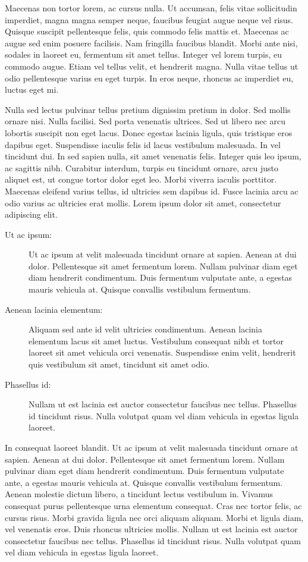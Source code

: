 Maecenas non tortor lorem, ac cursus nulla. Ut accumsan, felis vitae sollicitudin imperdiet, magna magna semper neque, faucibus feugiat augue neque vel risus. Quisque suscipit pellentesque felis, quis commodo felis mattis et. Maecenas ac augue sed enim posuere facilisis. Nam fringilla faucibus blandit. Morbi ante nisi, sodales in laoreet eu, fermentum sit amet tellus. Integer vel lorem turpis, eu commodo augue. Etiam vel tellus velit, et hendrerit magna. Nulla vitae tellus ut odio pellentesque varius eu eget turpis. In eros neque, rhoncus ac imperdiet eu, luctus eget mi.

Nulla sed lectus pulvinar tellus pretium dignissim pretium in dolor. Sed mollis ornare nisi. Nulla facilisi. Sed porta venenatis ultrices. Sed ut libero nec arcu lobortis suscipit non eget lacus. Donec egestas lacinia ligula, quis tristique eros dapibus eget. Suspendisse iaculis felis id lacus vestibulum malesuada. In vel tincidunt dui. In sed sapien nulla, sit amet venenatis felis. Integer quis leo ipsum, ac sagittis nibh. Curabitur interdum, turpis eu tincidunt ornare, arcu justo aliquet est, ut congue tortor dolor eget leo. Morbi viverra iaculis porttitor. Maecenas eleifend varius tellus, id ultricies sem dapibus id. Fusce lacinia arcu ac odio varius ac ultricies erat mollis. Lorem ipsum dolor sit amet, consectetur adipiscing elit. 

\begin{description}
\item[Ut ac ipsum:]
Ut ac ipsum at velit malesuada tincidunt ornare at sapien. Aenean at dui dolor. Pellentesque sit amet fermentum lorem. Nullam pulvinar diam eget diam hendrerit condimentum. Duis fermentum vulputate ante, a egestas mauris vehicula at. Quisque convallis vestibulum fermentum.

\item[Aenean lacinia elementum:]
Aliquam sed ante id velit ultricies condimentum. Aenean lacinia elementum lacus sit amet luctus. Vestibulum consequat nibh et tortor laoreet sit amet vehicula orci venenatis. Suspendisse enim velit, hendrerit quis vestibulum sit amet, tincidunt sit amet odio.

\item[Phasellus id:]
Nullam ut est lacinia est auctor consectetur faucibus nec tellus. Phasellus id tincidunt risus. Nulla volutpat quam vel diam vehicula in egestas ligula laoreet. 

\end{description}

In consequat laoreet blandit. Ut ac ipsum at velit malesuada tincidunt ornare at sapien. Aenean at dui dolor. Pellentesque sit amet fermentum lorem. Nullam pulvinar diam eget diam hendrerit condimentum. Duis fermentum vulputate ante, a egestas mauris vehicula at. Quisque convallis vestibulum fermentum. Aenean molestie dictum libero, a tincidunt lectus vestibulum in. Vivamus consequat purus pellentesque urna elementum consequat. Cras nec tortor felis, ac cursus risus. Morbi gravida ligula nec orci aliquam aliquam. Morbi et ligula diam, vel venenatis eros. Duis rhoncus ultricies mollis. Nullam ut est lacinia est auctor consectetur faucibus nec tellus. Phasellus id tincidunt risus. Nulla volutpat quam vel diam vehicula in egestas ligula laoreet. 

